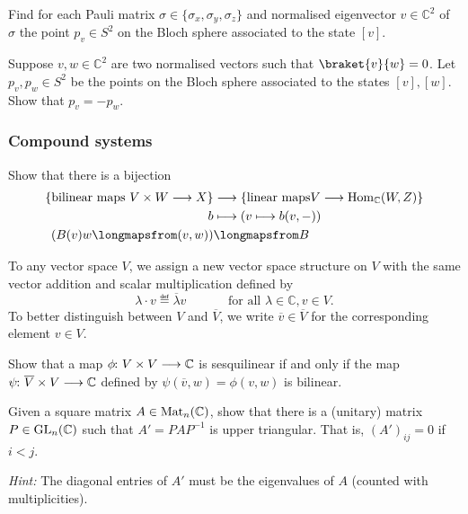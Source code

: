 \documentclass[a4paper, oneside, 12pt]{amsart}
\begin{document}
\begin{exercise}
  Find for each Pauli matrix \(\sigma \in\{\sigma_{x}, \sigma_{y}, \sigma_{z}\}\) and normalised eigenvector \(v \in \mathbb{C}^{2}\) of \(\sigma\) the point \(p_{v}\in S^{2}\) on the Bloch sphere associated to the state \([v]\).
\end{exercise}

\begin{exercise}
  Suppose \(v, w \in \mathbb{C}^{2}\) are two normalised vectors such that \(\braket{v}{w}= 0\).
  Let \(p_{v}, p_{w} \in S^{2} \) be the points on the Bloch sphere associated to the states \([v], [w]\).
  Show that \(p_{v} = - p_{w}\).
\end{exercise}

\subsubsection*{Compound systems}
\begin{exercise}\label{exe:bilinear-vs-linear-hom}
  Show that there is a bijection
  \begin{align*}
    \{\text{bilinear maps } V\times W \to X \} & \to \{\text{linear maps} V\to \Hom_{ \mathbb{C}}(W,Z) \} \\
    b & \mapsto (v\mapsto b(v, \blank)) \\
    (B(v) w \longmapsfrom (v,w)) &\longmapsfrom B
  \end{align*}
\end{exercise}


\begin{exercise}\label{exe:translating-bilinear-to-sesquilinear}
  To any vector space \( V \), we assign a new vector space structure on \(V\) with the same vector addition and scalar multiplication defined by
  \begin{equation*}
    \lambda \cdot v \eqdef \overline{\lambda}v \qquad\quad \text{ for all }\lambda \in \mathbb{C}, v\in V.
  \end{equation*}
  To better distinguish between \(V\) and \(\overline{V}\), we write \(\overline{v}\in \overline{V}\) for the corresponding element \(v\in V\).

  Show that a map \( \phi \from V \times V \to \mathbb{C} \) is sesquilinear if and only if the map \( \psi \from \overline{V} \times V \to \mathbb{C} \) defined by \( \psi(\overline{v}, w) = \phi(v, w) \) is bilinear.
\end{exercise}

\begin{exercise}\label{exe:schur-decomposition}
  Given a square matrix \(A\in \operatorname{Mat}_{n}( \mathbb{C})\), show that there is a (unitary) matrix \(P \in \operatorname{GL}_{n}( \mathbb{C})\) such that \(A'= PAP^{-1}\) is upper triangular.
  That is, \((A')_{ij} =0 \) if \(i<j\).

  \textit{Hint:} The diagonal entries of \(A'\) must be the eigenvalues of \(A\) (counted with multiplicities).
\end{exercise}
\end{document}
